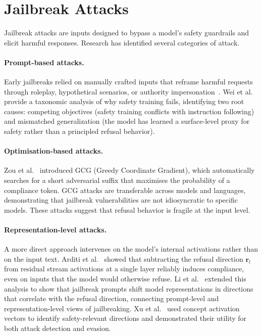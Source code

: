 \section{Jailbreak Attacks}
\label{sec:jailbreak}

Jailbreak attacks are inputs designed to bypass a model's safety guardrails and elicit harmful responses. Research has identified several categories of attack.

\paragraph{Prompt-based attacks.}
Early jailbreaks relied on manually crafted inputs that reframe harmful requests through roleplay, hypothetical scenarios, or authority impersonation~\citep{wei2023jailbroken}. Wei et al.~\citeyearpar{wei2023jailbroken} provide a taxonomic analysis of why safety training fails, identifying two root causes: competing objectives (safety training conflicts with instruction following) and mismatched generalization (the model has learned a surface-level proxy for safety rather than a principled refusal behavior).

\paragraph{Optimisation-based attacks.}
Zou et al.~\citeyearpar{zou2023universal} introduced GCG (Greedy Coordinate Gradient), which automatically searches for a short adversarial suffix that maximises the probability of a compliance token. GCG attacks are transferable across models and languages, demonstrating that jailbreak vulnerabilities are not idiosyncratic to specific models. These attacks suggest that refusal behavior is fragile at the input level.

\paragraph{Representation-level attacks.}
A more direct approach intervenes on the model's internal activations rather than on the input text. Arditi et al.~\citeyearpar{arditi2024refusal} showed that subtracting the refusal direction $\mathbf{r}_l$ from residual stream activations at a single layer reliably induces compliance, even on inputs that the model would otherwise refuse. Li et al.~\citeyearpar{li2025revisiting} extended this analysis to show that jailbreak prompts shift model representations in directions that correlate with the refusal direction, connecting prompt-level and representation-level views of jailbreaking. Xu et al.~\citeyearpar{xu2024uncovering} used concept activation vectors to identify safety-relevant directions and demonstrated their utility for both attack detection and evasion.

